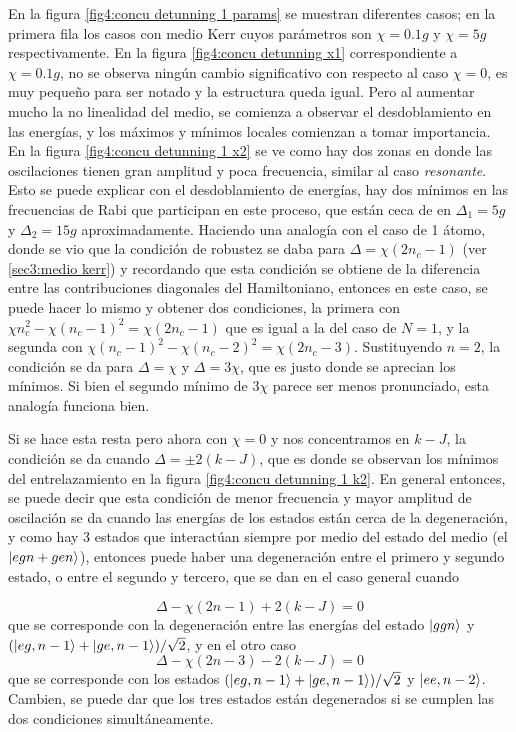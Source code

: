 En la figura \ref{fig4:concu detunning 1 params} se muestran diferentes casos; en la primera fila los casos con medio Kerr cuyos parámetros son $\chi=0.1g$ y $\chi=5g$ respectivamente. En la figura \ref{fig4:concu detunning x1} correspondiente a $\chi=0.1g$, no se observa ningún cambio significativo con respecto al caso $\chi=0$, es muy pequeño para ser notado y la estructura queda igual. Pero al aumentar mucho la no linealidad del medio, se comienza a observar el desdoblamiento en las energías, y los máximos y mínimos locales comienzan a tomar importancia. En la figura \ref{fig4:concu detunning 1 x2} se ve como hay dos zonas en donde las oscilaciones tienen gran amplitud y poca frecuencia, similar al caso \textit{resonante}. Esto se puede explicar con el desdoblamiento de energías, hay dos mínimos en las frecuencias de Rabi que participan en este proceso, que están ceca de en $\Delta_1=5g$ y $\Delta_2=15g$ aproximadamente. Haciendo una analogía con el caso de 1 átomo, donde se vio que la condición de robustez se daba para $\Delta=\chi(2n_c-1)$ (ver \ref{sec3:medio kerr}) y recordando que esta condición se obtiene de la diferencia entre las contribuciones diagonales del Hamiltoniano, entonces en este caso, se puede hacer lo mismo y obtener dos condiciones, la primera con $\chi n_c^2-\chi(n_c-1)^2=\chi(2n_c-1)$ que es igual a la del caso de $N=1$, y la segunda con $\chi(n_c-1)^2-\chi(n_c-2)^2=\chi(2n_c-3)$. Sustituyendo $n=2$, la condición se da para $\Delta=\chi$ y $\Delta=3\chi$, que es justo donde se aprecian los mínimos. Si bien el segundo mínimo de $3\chi$ parece ser menos pronunciado, esta analogía funciona bien.

Si se hace esta resta pero ahora con $\chi=0$ y nos concentramos en $k-J$, la condición se da cuando $\Delta=\pm 2(k-J)$, que es donde se observan los mínimos del entrelazamiento en la figura \ref{fig4:concu detunning 1 k2}. En general entonces, se puede decir que esta condición de menor frecuencia y mayor amplitud de oscilación se da cuando las energías de los estados están cerca de la degeneración, y como hay 3 estados que interactúan siempre por medio del estado del medio (el $\ket{egn+gen}$), entonces puede haber una degeneración entre el primero y segundo estado, o entre el segundo y tercero, que se dan en el caso general cuando

\begin{equation}
    \Delta-\chi(2n-1)+2(k-J)=0
    \label{ec4:condicion 1}
\end{equation}
que se corresponde con la degeneración entre las energías del estado $\ket{ggn}$ y $(\ket{eg,n-1}+\ket{ge,n-1})/\sqrt{2}$, y en el otro caso
\begin{equation}
    \Delta-\chi(2n-3)-2(k-J)=0
    \label{ec4:condicion 2}
\end{equation}
que se corresponde con los estados $(\ket{eg,n-1}+\ket{ge,n-1})/\sqrt{2}$ y $\ket{ee,n-2}$. Cambien, se puede dar que los tres estados están degenerados si se cumplen las dos condiciones simultáneamente.

